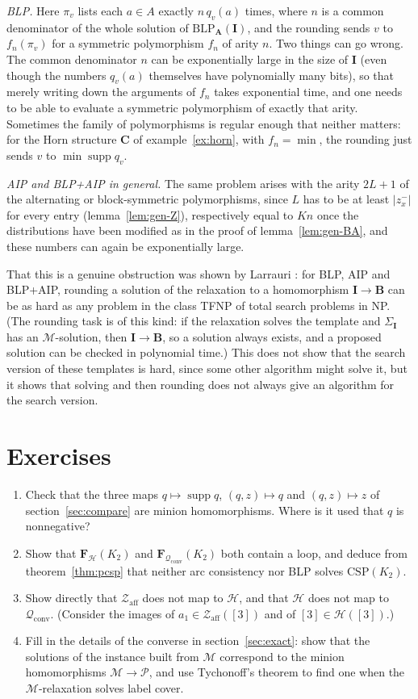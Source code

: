 \documentclass[11pt]{article}
\theoremstyle{plain}
\theoremstyle{definition}
\newcommand{\supp}{\operatorname{supp}}
\newcommand{\bA}{\mathbf{A}}
\newcommand{\bB}{\mathbf{B}}
\newcommand{\bI}{\mathbf{I}}
\newcommand{\bF}{\mathbf{F}}
\newcommand{\Pm}{\mathscr{P}}
\newcommand{\M}{\mathscr{M}}
\newcommand{\Hm}{\mathscr{H}}
\newcommand{\Qc}{\mathscr{Q}_{\mathrm{conv}}}
\newcommand{\Za}{\mathscr{Z}_{\mathrm{aff}}}
\newcommand{\CSP}{\mathrm{CSP}}
\newcommand{\BLP}{\mathrm{BLP}}
\begin{document}
\emph{BLP.} Here $\pi_v$ lists each $a\in A$ exactly $n\,q_v(a)$ times, where $n$ is a common denominator of the whole solution of $\BLP_{\bA}(\bI)$, and the rounding sends $v$ to $f_n(\pi_v)$ for a symmetric polymorphism $f_n$ of arity $n$. Two things can go wrong. The common denominator $n$ can be exponentially large in the size of $\bI$ (even though the numbers $q_v(a)$ themselves have polynomially many bits), so that merely writing down the arguments of $f_n$ takes exponential time, and one needs to be able to evaluate a symmetric polymorphism of exactly that arity. Sometimes the family of polymorphisms is regular enough that neither matters: for the Horn structure $\mathbf C$ of example~\ref{ex:horn}, with $f_n=\min$, the rounding just sends $v$ to $\min\supp q_v$.

\emph{AIP and BLP+AIP in general.} The same problem arises with the arity $2L+1$ of the alternating or block-symmetric polymorphisms, since $L$ has to be at least $|z_x^-|$ for every entry (lemma~\ref{lem:gen-Z}), respectively equal to $Kn$ once the distributions have been modified as in the proof of lemma~\ref{lem:gen-BA}, and these numbers can again be exponentially large.

That this is a genuine obstruction was shown by Larrauri \cite{Lar}: for BLP, AIP and BLP+AIP, rounding a solution of the relaxation to a homomorphism $\bI\to\bB$ can be as hard as any problem in the class TFNP of total search problems in NP. (The rounding task is of this kind: if the relaxation solves the template and $\Sigma_{\bI}$ has an $\M$-solution, then $\bI\to\bB$, so a solution always exists, and a proposed solution can be checked in polynomial time.) This does not show that the search version of these templates is hard, since some other algorithm might solve it, but it shows that solving and then rounding does not always give an algorithm for the search version.

\section*{Exercises}

\begin{enumerate}[label=\arabic*.]
  \item Check that the three maps $q\mapsto\supp q$, $(q,z)\mapsto q$ and $(q,z)\mapsto z$ of section~\ref{sec:compare} are minion homomorphisms. Where is it used that $q$ is nonnegative?
  \item Show that $\bF_\Hm(K_2)$ and $\bF_{\Qc}(K_2)$ both contain a loop, and deduce from theorem~\ref{thm:pcsp} that neither arc consistency nor BLP solves $\CSP(K_2)$.
  \item Show directly that $\Za$ does not map to $\Hm$, and that $\Hm$ does not map to $\Qc$. (Consider the images of $a_1\in\Za([3])$ and of $[3]\in\Hm([3])$.)
  \item Fill in the details of the converse in section~\ref{sec:exact}: show that the solutions of the instance built from $\M$ correspond to the minion homomorphisms $\M\to\Pm$, and use Tychonoff's theorem to find one when the $\M$-relaxation solves label cover.
\end{enumerate}
\end{document}
